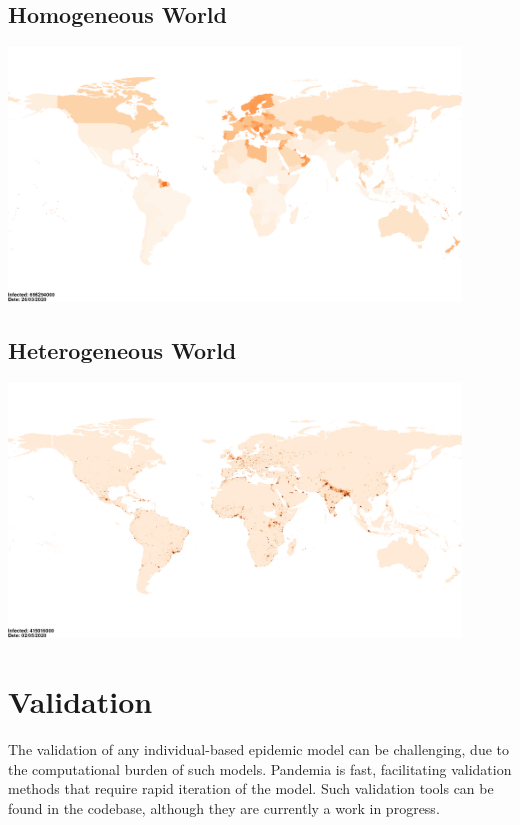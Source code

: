 \documentclass[10pt,letterpaper]{article}
\begin{document}
\subsection{Homogeneous World}

\begin{center}
\includegraphics[width=0.9\textwidth]{homogeneous}
\end{center}

\subsection{Heterogeneous World}

\begin{center}
\includegraphics[width=0.9\textwidth]{heterogeneous}
\end{center}

\section{Validation}

The validation of any individual-based epidemic model can be challenging, due to the computational burden of such models. Pandemia is fast, facilitating validation methods that require rapid iteration of the model. Such validation tools can be found in the codebase, although they are currently a work in progress.
\end{document}
